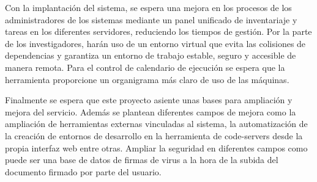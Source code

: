Con la implantación del sistema, se espera una mejora en los procesos de los administradores de los sistemas mediante un panel unificado de inventariaje y tareas en los diferentes servidores, reduciendo los tiempos de gestión. Por la parte de los investigadores, harán uso de un entorno virtual que evita las colisiones de dependencias y garantiza un entorno de trabajo estable, seguro y accesible de manera remota. Para el control de calendario de ejecución se espera que la herramienta proporcione un organigrama más claro de uso de las máquinas. 


Finalmente se espera que este proyecto asiente unas bases para ampliación y mejora del servicio. Además se plantean diferentes campos de mejora como la ampliación de herramientas externas vinculadas al sistema, la automatización de la creación de entornos de desarrollo en la herramienta de code-servers desde la propia interfaz web entre otras. Ampliar la seguridad en diferentes campos como puede ser una base de datos de firmas de virus a la hora de la subida del documento firmado por parte del usuario.

